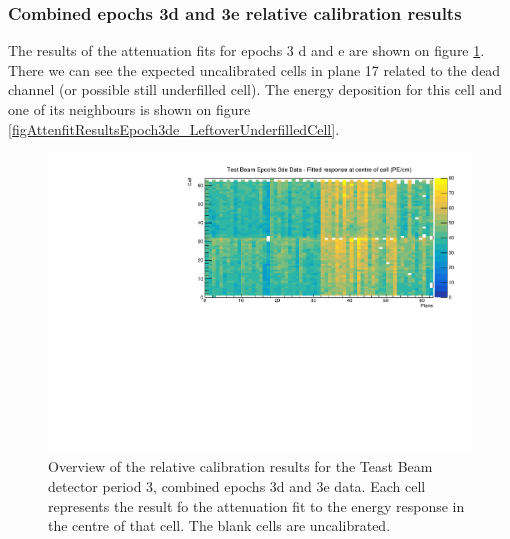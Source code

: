 \documentclass[12pt,a4paper]{article}
\begin{document}
\subsubsection*{Combined epochs 3d and 3e relative calibration results}

The results of the attenuation fits for epochs 3 d and e are shown on figure \ref{figCellCentreResponseEp3de}. There we can see the expected uncalibrated cells in plane 17 related to the dead channel (or possible still underfilled cell). The energy deposition for this cell and one of its neighbours is shown on figure \ref{figAttenfitResultsEpoch3de_LeftoverUnderfilledCell}.

\begin{figure}[!hbtp]
\centering
\includegraphics[width=\textwidth]{Plots/CellResponseAtCentre_epoch3de_Limited.pdf}
\caption{Overview of the relative calibration results for the Teast Beam detector period 3, combined epochs 3d and 3e data. Each cell represents the result fo the attenuation fit to the energy response in the centre of that cell. The blank cells are uncalibrated.}
\label{figCellCentreResponseEp3de}
\end{figure}
\end{document}
